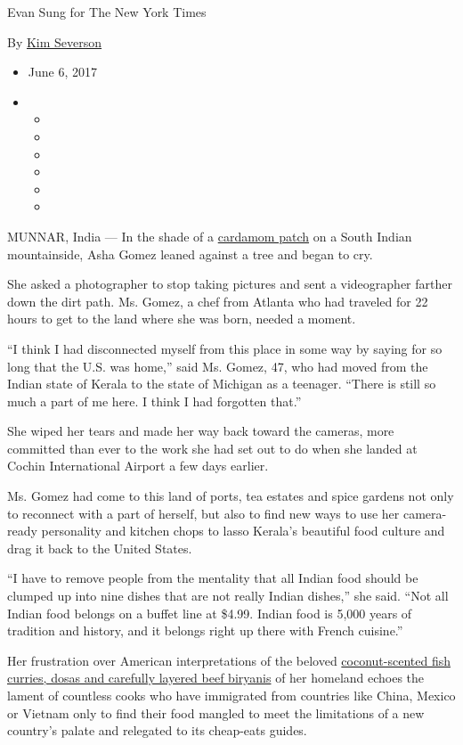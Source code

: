 Evan Sung for The New York Times

By \href{http://www.nytimes3xbfgragh.onion/by/kim-severson}{Kim
Severson}

\begin{itemize}
\item
  June 6, 2017
\item
  \begin{itemize}
  \item
  \item
  \item
  \item
  \item
  \item
  \end{itemize}
\end{itemize}

MUNNAR, India --- In the shade of a
\href{https://www.youtube.com/watch?v=GKrD9SFhi-Q}{cardamom patch} on a
South Indian mountainside, Asha Gomez leaned against a tree and began to
cry.

She asked a photographer to stop taking pictures and sent a videographer
farther down the dirt path. Ms. Gomez, a chef from Atlanta who had
traveled for 22 hours to get to the land where she was born, needed a
moment.

``I think I had disconnected myself from this place in some way by
saying for so long that the U.S. was home,'' said Ms. Gomez, 47, who had
moved from the Indian state of Kerala to the state of Michigan as a
teenager. ``There is still so much a part of me here. I think I had
forgotten that.''

She wiped her tears and made her way back toward the cameras, more
committed than ever to the work she had set out to do when she landed at
Cochin International Airport a few days earlier.

Ms. Gomez had come to this land of ports, tea estates and spice gardens
not only to reconnect with a part of herself, but also to find new ways
to use her camera-ready personality and kitchen chops to lasso Kerala's
beautiful food culture and drag it back to the United States.

``I have to remove people from the mentality that all Indian food should
be clumped up into nine dishes that are not really Indian dishes,'' she
said. ``Not all Indian food belongs on a buffet line at \$4.99. Indian
food is 5,000 years of tradition and history, and it belongs right up
there with French cuisine.''

Her frustration over American interpretations of the beloved
\href{https://www.bbcgoodfood.com/howto/guide/top-10-foods-try-kerala}{coconut-scented
fish curries, dosas and carefully layered beef biryanis} of her homeland
echoes the lament of countless cooks who have immigrated from countries
like China, Mexico or Vietnam only to find their food mangled to meet
the limitations of a new country's palate and relegated to its
cheap-eats guides.


